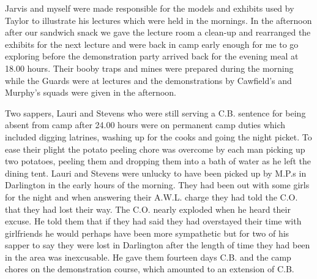 \Corporal Jarvis and myself were made responsible for the models and
exhibits used by \lieutenant Taylor to illustrate his lectures which
were held in the mornings. In the afternoon after our sandwich snack
we gave the lecture room a clean-up and rearranged the exhibits for
the next lecture and were back in camp early enough for me to go
exploring before the demonstration party arrived back for the evening
meal at 18.00 hours. Their booby traps and mines were prepared during
the morning while the Guards were at lectures and the demonstrations
by \sergeant Cawfield's and \corporal Murphy's squads were given in the
afternoon.

Two sappers, Lauri and Stevens who were still serving a C.B. sentence
for being absent from camp after 24.00 hours were on permanent camp
duties which included digging latrines, washing up for the cooks and
going the night picket. To ease their plight the potato peeling chore
was overcome by each man picking up two potatoes, peeling them and
dropping them into a bath of water as he left the dining tent. Lauri
and Stevens were unlucky to have been picked up by M.P.s in Darlington
in the early hours of the morning. They had been out with some girls
for the night and when answering their A.W.L. charge they had told the
C.O. that they had lost their way. The C.O. nearly exploded when he
heard their excuse. He told them that if they had said they had
overstayed their time with girlfriends he would perhaps have been more
sympathetic but for two of his sapper to say they were lost in
Darlington after the length of time they had been in the area was
inexcusable. He gave them fourteen days C.B. and the camp chores on
the demonstration course, which amounted to an extension of C.B.

